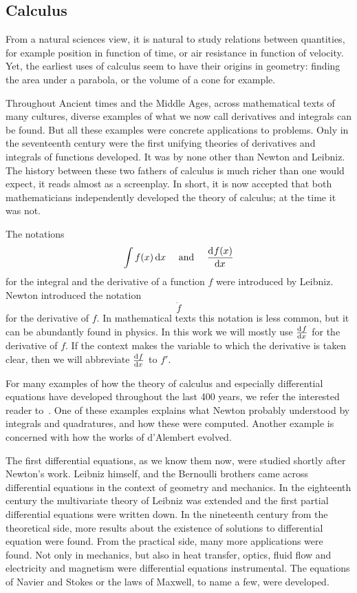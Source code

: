 \subsection{Calculus}

From a natural sciences view, it is natural to study relations between quantities, for example position in function of time, or air resistance in function of velocity. Yet, the earliest uses of calculus seem to have their origins in geometry: finding the area under a parabola, or the volume of a cone for example.

Throughout Ancient times and the Middle Ages, across mathematical texts of many cultures, diverse examples of what we now call derivatives and integrals can be found. But all these examples were concrete applications to problems. Only in the seventeenth century were the first unifying theories of derivatives and integrals of functions developed. It was by none other than Newton and Leibniz. The history between these two fathers of calculus is much richer than one would expect, it reads almost as a screenplay. In short, it is now accepted that both mathematicians independently developed the theory of calculus; at the time it was not.

The notations
$$
    \int f(x) \, \dd x \quad \text{ and } \quad \dv[]{f(x)}{x}
$$
for the integral and the derivative of a function $f$ were introduced by Leibniz. Newton introduced the notation
$$
    \dot{f}
$$
for the derivative of $f$. In mathematical texts this notation is less common, but it can be abundantly found in physics. In this work we will mostly use $\dv[]{f}{x}$ for the derivative of $f$. If the context makes the variable to which the derivative is taken clear, then we will abbreviate $\dv[]{f}{x}$ to $f'$.

For many examples of how the theory of calculus and especially differential equations have developed throughout the last 400 years, we refer the interested reader to~\cite{archibald_history_2005}. One of these examples explains what Newton probably understood by integrals and quadratures, and how these were computed. Another example is concerned with how the works of d'Alembert evolved.


The first differential equations, as we know them now, were studied shortly after Newton's work. Leibniz himself, and the Bernoulli brothers came across differential equations in the context of geometry and mechanics. In the eighteenth century the multivariate theory of Leibniz was extended and the first partial differential equations were written down. In the nineteenth century from the theoretical side, more results about the existence of solutions to differential equation were found. From the practical side, many more applications were found. Not only in mechanics, but also in heat transfer, optics, fluid flow and electricity and magnetism were differential equations instrumental. The equations of Navier and Stokes or the laws of Maxwell, to name a few, were developed.

